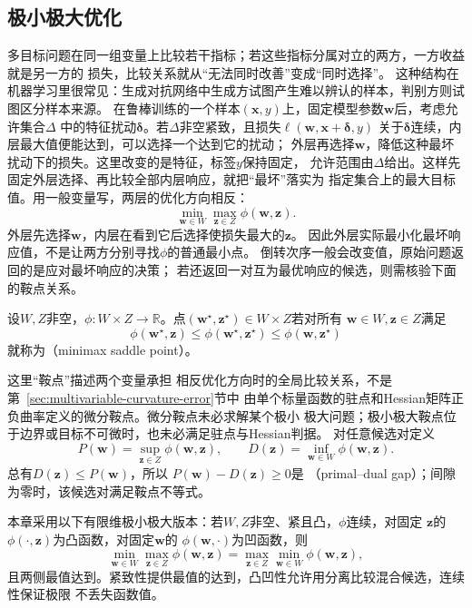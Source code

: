 \subsection{极小极大优化}
\label{sec:opt-minimax}

多目标问题在同一组变量上比较若干指标；若这些指标分属对立的两方，一方收益就是另一方的
损失，比较关系就从“无法同时改善”变成“同时选择”。
这种结构在机器学习里很常见：生成对抗网络中生成方试图产生难以辨认的样本，判别方则试图区分样本来源。
在鲁棒训练的一个样本$(\bm x,y)$上，固定模型参数$\bm w$后，考虑允许集合$\Delta$
中的特征扰动$\bm\delta$。若$\Delta$非空紧致，且损失$\ell(\bm w,\bm x+\bm\delta,y)$
关于$\bm\delta$连续，内层最大值便能达到，可以选择一个达到它的扰动；
外层再选择$\bm w$，降低这种最坏扰动下的损失。这里改变的是特征，标签$y$保持固定，
允许范围由$\Delta$给出。这样先固定外层选择、再比较全部内层响应，就把“最坏”落实为
指定集合上的最大目标值。用一般变量写，两层的优化方向相反：
\[
  \min_{\bm{w}\in W}\max_{\bm{z}\in Z}\phi(\bm{w},\bm{z}).
\]
外层先选择$\bm w$，内层在看到它后选择使损失最大的$\bm z$。
因此外层实际最小化最坏响应值，不是让两方分别寻找$\phi$的普通最小点。
倒转次序一般会改变值，原始问题返回的是应对最坏响应的决策；
若还返回一对互为最优响应的候选，则需核验下面的鞍点关系。
\begin{definition}[极小极大鞍点]
\label{def:opt-minimax-saddle}
设$W,Z$非空，$\phi:W\times Z\to\mathbb R$。点$(\bm w^\star,\bm z^\star)\in W\times Z$若对所有
$\bm w\in W,\bm z\in Z$满足
\[
  \phi(\bm{w}^{\star},\bm{z})
  \leq\phi(\bm{w}^{\star},\bm{z}^{\star})
  \leq\phi(\bm{w},\bm{z}^{\star})
\]
就称为（minimax saddle point）。
\end{definition}
这里“鞍点”描述两个变量承担
相反优化方向时的全局比较关系，不是第~\ref{sec:multivariable-curvature-error}节中
由单个标量函数的驻点和Hessian矩阵正负曲率定义的微分鞍点。微分鞍点未必求解某个极小
极大问题；极小极大鞍点位于边界或目标不可微时，也未必满足驻点与Hessian判据。
对任意候选对定义
\[
  P(\bm{w})=\sup_{\bm{z}\in Z}\phi(\bm{w},\bm{z}),\qquad
  D(\bm{z})=\inf_{\bm{w}\in W}\phi(\bm{w},\bm{z}).
\]
总有$D(\bm{z})\leq P(\bm{w})$，所以
$P(\bm{w})-D(\bm{z})\geq0$是
（primal--dual gap）；间隙为零时，该候选对满足鞍点不等式。

本章采用以下有限维极小极大版本：若$W,Z$非空、紧且凸，$\phi$连续，对固定
$\bm{z}$的$\phi(\cdot,\bm{z})$为凸函数，对固定$\bm{w}$的
$\phi(\bm{w},\cdot)$为凹函数，则
\[
  \min_{\bm{w}\in W}\max_{\bm{z}\in Z}\phi(\bm{w},\bm{z})
  =
  \max_{\bm{z}\in Z}\min_{\bm{w}\in W}\phi(\bm{w},\bm{z}),
\]
且两侧最值达到。紧致性提供最值的达到，凸凹性允许用分离比较混合候选，连续性保证极限
不丢失函数值。

